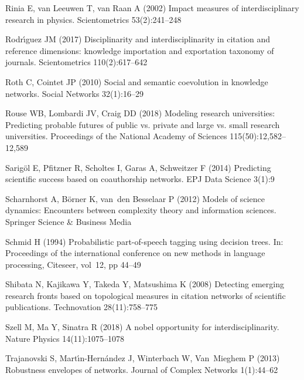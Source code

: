 \begin{thebibliography}{84}
Rinia E, van Leeuwen T, van Raan A (2002) Impact measures of interdisciplinary
  research in physics. Scientometrics 53(2):241--248

Rodr{\'\i}guez JM (2017) Disciplinarity and interdisciplinarity in citation and
  reference dimensions: knowledge importation and exportation taxonomy of
  journals. Scientometrics 110(2):617--642

Roth C, Cointet JP (2010) Social and semantic coevolution in knowledge
  networks. Social Networks 32(1):16--29

Rouse WB, Lombardi JV, Craig DD (2018) Modeling research universities:
  Predicting probable futures of public vs. private and large vs. small
  research universities. Proceedings of the National Academy of Sciences
  115(50):12,582--12,589

Sarig{\"o}l E, Pfitzner R, Scholtes I, Garas A, Schweitzer F (2014) Predicting
  scientific success based on coauthorship networks. EPJ Data Science 3(1):9

Scharnhorst A, B{\"o}rner K, van~den Besselaar P (2012) Models of science
  dynamics: Encounters between complexity theory and information sciences.
  Springer Science \& Business Media

Schmid H (1994) Probabilistic part-of-speech tagging using decision trees. In:
  Proceedings of the international conference on new methods in language
  processing, Citeseer, vol~12, pp 44--49

Shibata N, Kajikawa Y, Takeda Y, Matsushima K (2008) Detecting emerging
  research fronts based on topological measures in citation networks of
  scientific publications. Technovation 28(11):758--775

Szell M, Ma Y, Sinatra R (2018) A nobel opportunity for interdisciplinarity.
  Nature Physics 14(11):1075--1078

Trajanovski S, Mart{\'\i}n-Hern{\'a}ndez J, Winterbach W, Van~Mieghem P (2013)
  Robustness envelopes of networks. Journal of Complex Networks 1(1):44--62


\end{thebibliography}
